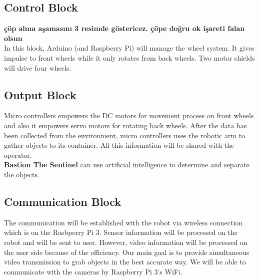 \documentclass[12pt,a4paper]{article}
\begin{document}
   \subsection{Control Block}
    \begin{flushleft}
     \textbf{çöp alma aşamasını 3 resimde göstericez. çöpe doğru ok işareti falan olsun}\\
     In this block, Arduino (and Raspberry Pi) will manage the wheel system. It gives impulse to front wheels while it only 
     rotates from back wheels. Two motor shields will drive four wheels.
    \end{flushleft}

   \subsection{Output Block}
    \begin{flushleft}
     Micro controllers empowers the DC motors for movement process on front wheels and also it empowers servo motors for 
     rotating back wheels. After the data has been collected from the environment, micro controllers uses the robotic arm 
     to gather objects to its container. All this information will be shared with the operator.\\
     \textbf{Bastion The Sentinel} can use artificial intelligence to determine and separate the objects.
    \end{flushleft}

   \subsection{Communication Block}
    \begin{flushleft}
     The communication will be established with the robot via wireless connection which is on the Rasbperry Pi 3. Sensor 
     information will be processed on the robot and will be sent to user. However, video information will be processed on 
     the user side because of the efficiency. Our main goal is to provide simultaneous video transmission to grab 
     objects in the best accurate way. We will be able to communicate with the cameras by Raspberry Pi 3's WiFi. 
    \end{flushleft}
 
\end{document}
